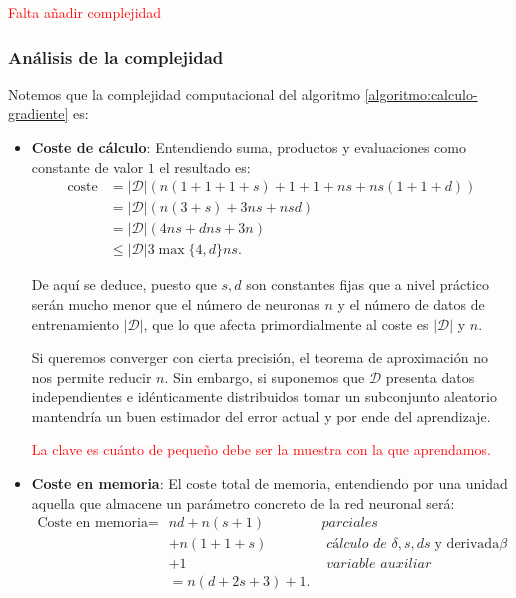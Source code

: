 \textcolor{red}{Falta añadir complejidad}

\subsubsection*{Análisis de la complejidad}  
Notemos que la complejidad computacional del algoritmo  \ref{algoritmo:calculo-gradiente} es:
\begin{itemize}
    \item \textbf{Coste de cálculo}:  Entendiendo suma, productos y evaluaciones como constante de valor $1$ el resultado es: 
    \begin{align}
        \text{coste} &=
        |\mathcal{D}| 
        \left(
            n(1+1+1 + s) + 
            1+1 +
            n s 
            + n s (1 + 1 + d) 
        \right) 
        \\
        & =   
        |\mathcal{D}| 
        ( 
            n (3 + s)  
            +  3 n s
            + n s d
        ) 
        \\
        & = |\mathcal{D}|
        (
            4 n s + d n s + 3 n
        )  
        \\
        & \leq 
        |\mathcal{D}|
        3 \max \{4, d \} n s.
    \end{align} 

    De aquí se deduce, puesto que $s,d$ son constantes fijas que a nivel práctico serán mucho menor que el número de neuronas  $n$ y el número de datos de entrenamiento $|\mathcal{D}| $, que lo que afecta primordialmente al coste es $|\mathcal{D}| $ y $n$. 
    
    Si queremos converger con cierta precisión, el teorema de aproximación no nos permite reducir $n$. Sin embargo, si suponemos que $\mathcal{D}$
    presenta datos independientes e idénticamente distribuidos tomar un subconjunto aleatorio mantendría un buen estimador del error actual y por ende del aprendizaje. 

    \textcolor{red}{La clave es cuánto de pequeño debe ser la muestra con la que aprendamos.}

    \item \textbf{Coste en memoria}: 
    El coste total de memoria, entendiendo por una unidad aquella que almacene un parámetro concreto de la red neuronal será: 
    \begin{align}
        \text{Coste en memoria} = &
         n d + n (s + 1) \; &  \textit{parciales}
         \\& + n (1 + 1 + s)  \; & \textit{ cálculo de }
          \delta, s, d s \; \text{y derivada}\beta
         \\& +1 \; &  \textit{ variable auxiliar}
         \\& = n (d + 2s +3) +1.
    \end{align}
\end{itemize} 



